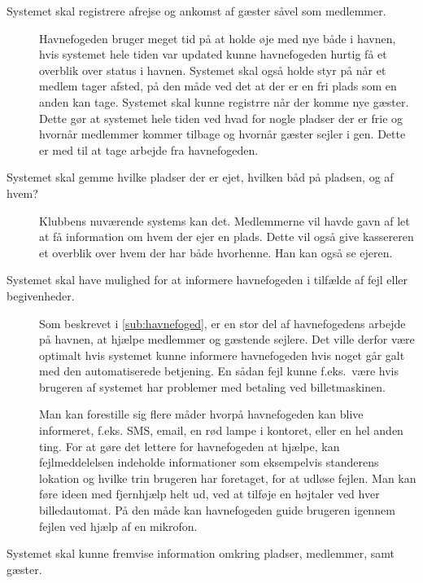 \begin{description} 
  \item[Systemet skal registrere afrejse og ankomst af gæster såvel som medlemmer.\\]


  Havnefogeden bruger meget tid på at holde øje med nye både i havnen, hvis systemet hele tiden var updated kunne havnefogeden hurtig få et overblik over status i havnen. Systemet skal også holde styr på når et medlem tager afsted, på den måde ved det at der er en fri plads som en anden kan tage. Systemet skal kunne registrre når der komme nye gæster. Dette gør at systemet hele tiden ved hvad for nogle pladser der er frie og  hvornår medlemmer kommer tilbage og hvornår gæster sejler i gen. Dette er med til at tage arbejde fra havnefogeden.


  \item[Systemet skal gemme hvilke pladser der er ejet, hvilken båd på pladsen, og af hvem?]

  Klubbens nuværende systems kan det. Medlemmerne vil havde gavn af let at få information om hvem der ejer en plads. Dette vil også give kassereren et overblik over hvem der har både hvorhenne. Han kan også se ejeren.


  \item[Systemet skal have mulighed for at informere havnefogeden i tilfælde af fejl eller begivenheder.]

  Som beskrevet i \cref{sub:havnefoged}, er en stor del af havnefogedens arbejde på havnen, at hjælpe medlemmer og gæstende sejlere. Det ville derfor være optimalt hvis systemet kunne informere havnefogeden hvis noget går galt med den automatiserede betjening. En sådan fejl kunne f.eks.\ være hvis brugeren af systemet har problemer med betaling ved billetmaskinen.

  Man kan forestille sig flere måder hvorpå havnefogeden kan blive informeret, f.eks. SMS, email, en rød lampe i kontoret, eller en hel anden ting. For at gøre det lettere for havnefogeden at hjælpe, kan fejlmeddelelsen indeholde informationer som eksempelvis standerens lokation og hvilke trin brugeren har foretaget, for at udløse fejlen. Man kan føre ideen med fjernhjælp helt ud, ved at tilføje en højtaler ved hver billedautomat. På den måde kan havnefogeden guide brugeren igennem fejlen ved hjælp af en mikrofon.


  \item[Systemet skal kunne fremvise information omkring pladser, medlemmer, samt gæster.]


\end{description}

